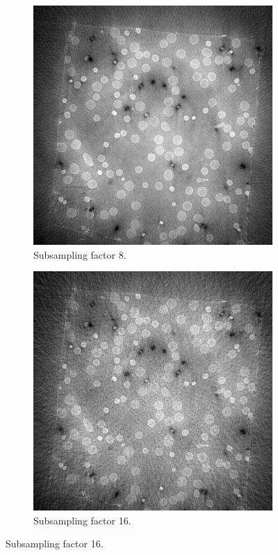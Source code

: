 \begin{figure}
  \begin{subfigure}[t]{.45\textwidth}
    \centering
    \includegraphics[width=\linewidth]{figures/ns8.png}
    \caption{Subsampling factor 8. }
  \end{subfigure}
  \hfill
  \begin{subfigure}[t]{.45\textwidth}
    \centering
    \includegraphics[width=\linewidth]{figures/ns16.png}
    \caption{Subsampling factor 16. }
  \end{subfigure}


\end{figure}
